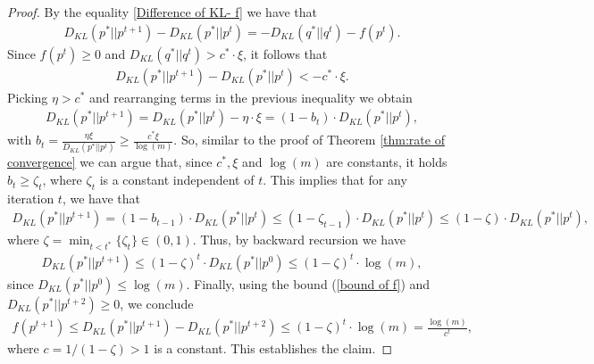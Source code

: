 \documentclass[10pt,a4paper]{amsart}
\begin{document}
\begin{proof}
\noindent By the equality \eqref{Difference of KL- f} we have that 
\begin{equation*}
\begin{split}
D_{KL}(p^* || p^{t+1}) - D_{KL}(p^* || p^{t}) = - D_{KL}(q^*||q^t) - f(p^t).
\end{split}
\end{equation*}
Since $f(p^t) \geq 0$ and $D_{KL}(q^*|| q^t)> c^* \cdot \xi$, it follows that
\begin{equation*}
\begin{split}
D_{KL}(p^* || p^{t+1}) - D_{KL}(p^* || p^{t}) <- c^*\cdot \xi.
\end{split}
\end{equation*}
Picking $\eta > c^*$ and rearranging terms in the previous inequality we obtain
\begin{equation*}
\begin{split}
D_{KL}(p^* || p^{t+1})  =  D_{KL}(p^* || p^{t})- \eta \cdot \xi = (1-b_{t}) \cdot D_{KL}(p^* || p^{t}),
\end{split}
\end{equation*}
with $b_{t} =  \frac{\eta \xi} {D_{KL}(p^* || p^{t})} \geq \frac{c^* \xi} {\log (m) }$. 
So, similar to the proof of Theorem \ref{thm:rate of convergence} we can argue that, since $c^*,\xi$ and $\log (m)$ are constants, it holds $b_{t} \geq \zeta_{t}$, where $\zeta_{t}$ is a constant independent of $t$. This implies that for any iteration $t$, we have that
\begin{equation*}
\begin{split}
    D_{KL}(p^* || p^{t+1}) = (1-b_{t-1})\cdot D_{KL}(p^* || p^{t}) \leq (1-\zeta_{t-1}) \cdot D_{KL}(p^* || p^{t})\leq (1-\zeta) \cdot D_{KL}(p^* || p^{t}),
\end{split}
\end{equation*}
where $\zeta = \min_{t < t^*} \{\zeta_t\} \in (0,  1)$. Thus, by backward recursion we have
\begin{equation*}
\begin{split}
    D_{KL}(p^* || p^{t+1}) \leq (1-\zeta)^t \cdot D_{KL}(p^* || p^{0}) \leq (1-\zeta)^t \cdot \log (m),  
\end{split}
\end{equation*}
since $D_{KL}(p^*||p^{0}) \leq \log (m)$.
Finally, using the bound (\ref{bound of f}) and $D_{KL}(p^* || p^{t+2}) \geq 0$, we conclude
\begin{equation*}
\begin{split}
    f(p^{t+1}) \leq D_{KL}(p^* || p^{t+1}) -D_{KL}(p^* || p^{t+2}) \leq (1-\zeta)^t \cdot \log (m)=\frac{\log(m)}{c^t},  
\end{split}
\end{equation*}
where $c = 1/(1-\zeta) > 1$ is a constant. This establishes the claim.


\end{proof}
\end{document}
